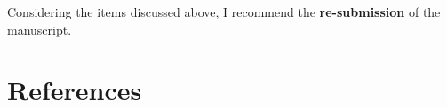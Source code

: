 \documentclass[11pt]{article}
\begin{document}
Considering the items discussed above, I recommend the \textbf{re-submission} of the manuscript.

\section*{References}
\label{sec:orgf3eaf84}
\printbibliography[heading=none]
\end{document}
